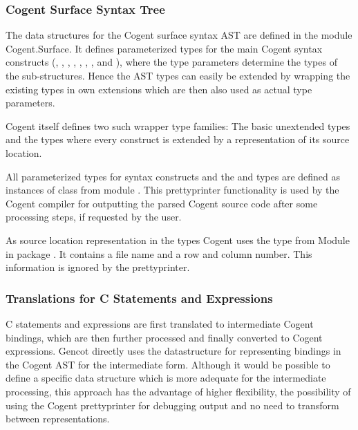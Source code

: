 \subsubsection{Cogent Surface Syntax Tree}

The data structures for the Cogent surface syntax AST are defined in the module Cogent.Surface. It defines parameterized types
for the main Cogent syntax constructs (, , , , , 
, , and ), where the type parameters determine the types of the 
sub-structures. Hence the AST types
can easily be extended by wrapping the existing types in own extensions which are then also used as actual type parameters.

Cogent itself defines two such wrapper type families: The basic unextended types  and the types 
where every construct is extended by a representation of its source location. 

All parameterized types for syntax constructs and the  and  types are defined as instances of 
class  from
module . This prettyprinter functionality is used by the Cogent compiler for outputting
the parsed Cogent source code after some processing steps, if requested by the user.

As source location representation in the  types Cogent uses the type  from Module 
 in package .
It contains a file name and a row and column number. This information is ignored by the prettyprinter.

\subsubsection{Translations for C Statements and Expressions}

C statements and expressions are first translated to intermediate Cogent bindings, which are then further processed
and finally converted to Cogent expressions. Gencot directly uses the datastructure for representing bindings
in the Cogent AST for the intermediate form. Although it would be possible to define a specific data structure
which is more adequate for the intermediate processing, this approach has the advantage of higher flexibility,
the possibility of using the Cogent prettyprinter for debugging output and no need to transform between representations.

